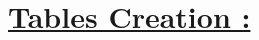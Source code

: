 \documentclass{article}
\begin{document}
\renewcommand{\arrayrulewidth}{0.75mm} %
\setlength{\tabcolsep}{10pt} %
\renewcommand{\arraystretch}{1} %

\section*{\underline{Tables Creation :}}

\end{document}

